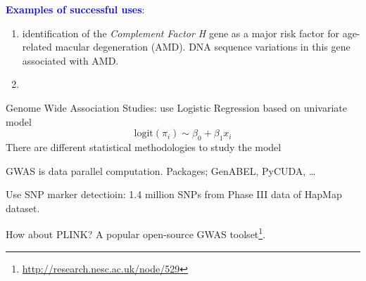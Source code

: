 \textcolor{blue}{\bf Examples of successful uses}:
\begin{enumerate}
  \item identification of the {\it Complement Factor H} gene as a major risk
  factor for age-related macular degeneration (AMD).
  DNA sequence variations in this gene associated with AMD.
  
  \item 
\end{enumerate}







Genome Wide Association Studies: use Logistic Regression based on univariate
model
\begin{equation}
\text{logit}(\pi_i) \sim \beta_0 + \beta_1 x_i
\end{equation}
There are different statistical methodologies to study the model

GWAS is data parallel computation. Packages; GenABEL, PyCUDA, \ldots 

Use SNP marker detectioin: 1.4 million SNPs from Phase III data of HapMap
dataset. 


How about PLINK? A popular open-source GWAS
toolset\footnote{\url{http://research.nesc.ac.uk/node/529}}. 





